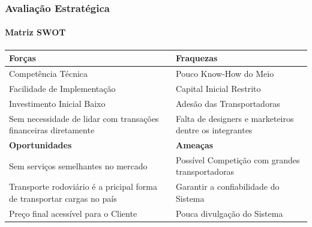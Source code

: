 \documentclass{beamer}
\begin{document}
\begin{frame}
  \frametitle{Avaliação Estratégica}
  \framesubtitle{Matriz SWOT}
  \begin{tabular}{|p{5.0cm}|p{5.0cm}|}
  \hline
   \textbf{Forças} & \textbf{Fraquezas}\\ \hline
    Competência Técnica & Pouco Know-How do Meio \\ \hline
   Facilidade de Implementação & Capital Inicial Restrito \\ \hline
   Investimento Inicial Baixo & Adesão das Transportadoras\\ \hline
   Sem necessidade de lidar com transações financeiras diretamente &  Falta de designers e marketeiros dentre os integrantes \\ \hline
    \textbf{Oportunidades} & \textbf{Ameaças}\\ \hline
Sem serviços semelhantes no mercado & Possível Competição com grandes transportadoras\\ \hline
Transporte rodoviário é a pricipal  forma de transportar cargas no país & Garantir a confiabilidade do Sistema \\   \hline
   Preço final acessível para o Cliente & Pouca divulgação do Sistema\\ \hline
  \end{tabular}
\end{frame}
\end{document}
